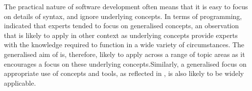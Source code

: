The practical nature of software development often means that it is easy to focus on details of syntax, and ignore underlying concepts. In terms of programming, \citet{Winslow:1996} indicated that experts tended to focus on generalised concepts, an observation that is likely to apply in other context as underlying concepts provide experts with the knowledge required to function in a wide variety of circumstances. The generalised aim of  is, therefore, likely to apply across a range of topic areas as it encourages a focus on these underlying concepts.Similarly, a generalised focus on appropriate use of concepts and tools, as reflected in , is also likely to be widely applicable.




